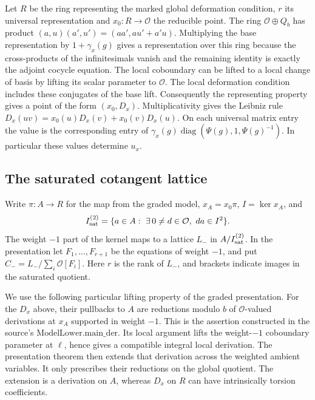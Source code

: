 Let \(R\) be the ring representing the marked global deformation
condition, \(r\) its universal representation and \(x_0:R\to\mathcal O\)
the reducible point. The ring \(\mathcal O\oplus Q_b\) has product
\((a,u)(a',u')=(aa',au'+a'u)\). Multiplying the base representation
by \(1+\gamma_x(g)\) gives a representation over this ring because
the cross-products of the infinitesimals vanish and the remaining
identity is exactly the adjoint cocycle equation. The local coboundary
can be lifted to a local change of basis by lifting its scalar
parameter to \(\mathcal O\). The local deformation condition includes
these conjugates of the base lift. Consequently the representing
property gives a point of the form \((x_0,D_x)\). Multiplicativity
gives the Leibniz rule
\(D_x(uv)=x_0(u)D_x(v)+x_0(v)D_x(u)\).
On each universal matrix entry the value is the corresponding
entry of \(\gamma_x(g)\operatorname{diag}(\Psi(g),1,\Psi(g)^{-1})\).
In particular these values determine \(u_x\).

\subsection{The saturated cotangent lattice}

Write \(\pi:A\to R\) for the map from the graded model, \(x_A=x_0\pi\),
\(I=\ker x_A\), and
\[
 I^{(2)}_{\rm sat}
   =\{a\in A:\ \exists\,0\ne d\in\mathcal O,\ da\in I^2\}.
\]
The weight \(-1\) part of the kernel maps to a lattice \(L_-\) in
\(A/I^{(2)}_{\rm sat}\). In the presentation let
\(F_1,\ldots,F_{r+1}\) be the equations of weight \(-1\), and put
\(C_-=L_-/\sum_i\mathcal O[F_i]\). Here \(r\) is the rank of
\(L_-\), and brackets indicate images in the saturated quotient.

We use the following particular lifting property of the graded
presentation. For the \(D_x\) above, their pullbacks to \(A\) are
reductions modulo \(b\) of \(\mathcal O\)-valued derivations at
\(x_A\) supported in weight \(-1\). This is the assertion constructed
in the source's \(\mathrm{ModelLower.main\_der}\). Its local argument
lifts the weight-\(-1\) coboundary parameter at \(\ell\), hence gives
a compatible integral local derivation. The presentation theorem then
extends that derivation across the weighted ambient variables. It
only prescribes their reductions on the global quotient. The
extension is a derivation on \(A\), whereas \(D_x\) on \(R\) can
have intrinsically torsion coefficients.

